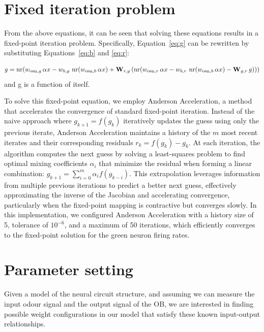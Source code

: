 \documentclass[12pt]{article}
\begin{document}
\section{Fixed iteration problem}
From the above equations, it can be seen that solving these equations results in a fixed-point iteration problem. Specifically, Equation~\eqref{eq:g} can be rewritten by substituting Equations~\eqref{eq:b} and \eqref{eq:r}:

\[
g = \operatorname{nr}\!\left(
    w_{\text{osn},g}\,\alpha x
    - w_{b,g}\, \operatorname{nr}\!\left(w_{\text{osn},b}\,\alpha x\right)
    + \mathbf{W}_{r,g}\, (\operatorname{nr}\!\left(
    w_{\text{osn},r}\,\alpha x
    - w_{b,r}\, \operatorname{nr}\!\left(w_{\text{osn},b}\,\alpha x\right)
    - \mathbf{W}_{g,r}\, g)
\right)
\right) \\[6pt]
\]
and g is a function of itself. 

To solve this fixed-point equation, we employ Anderson Acceleration, a method that accelerates the convergence of standard fixed-point iteration. Instead of the naive approach where $g_{k+1} = f(g_k)$ iteratively updates the guess using only the previous iterate, Anderson Acceleration maintains a history of the $m$ most recent iterates and their corresponding residuals $r_k = f(g_k) - g_k$. At each iteration, the algorithm computes the next guess by solving a least-squares problem to find optimal mixing coefficients $\alpha_i$ that minimize the residual when forming a linear combination: $g_{k+1} = \sum_{i=0}^{m} \alpha_i f(g_{k-i})$. This extrapolation leverages information from multiple previous iterations to predict a better next guess, effectively approximating the inverse of the Jacobian and accelerating convergence, particularly when the fixed-point mapping is contractive but converges slowly. In this implementation, we configured Anderson Acceleration with a history size of 5, tolerance of $10^{-6}$, and a maximum of 50 iterations, which efficiently converges to the fixed-point solution for the green neuron firing rates.



\section{Parameter setting}
Given a model of the neural circuit structure, and assuming we can measure the input odour signal and the output signal of the OB, we are interested in finding possible weight configurations in our model that satisfy these known input-output relationships.
\end{document}
